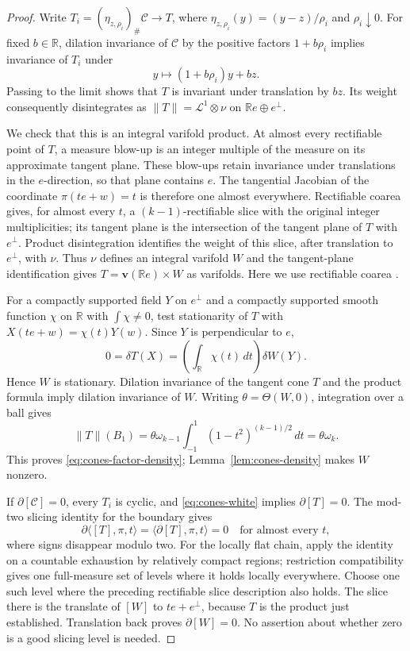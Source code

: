\begin{proof}
Write $T_i=(\eta_{z,\rho_i})_\#\mathcal C\to T$, where
$\eta_{z,\rho_i}(y)=(y-z)/\rho_i$ and $\rho_i\downarrow0$.
For fixed $b\in\mathbb R$, dilation invariance of $\mathcal C$
by the positive factors $1+b\rho_i$ implies invariance of $T_i$
under
\[
 y\longmapsto(1+b\rho_i)y+bz.
\]
Passing to the limit shows that $T$ is invariant under translation
by $bz$.  Its weight consequently disintegrates as
$\|T\|=\mathcal L^1\otimes\nu$ on
$\mathbb Re\oplus e^\perp$.

We check that this is an integral varifold product.
At almost every rectifiable point of $T$, a measure blow-up is an
integer multiple of the measure on its approximate tangent plane.
These blow-ups retain invariance under translations in the
$e$-direction, so that plane contains $e$.
The tangential Jacobian of the coordinate
$\pi(te+w)=t$ is therefore one almost everywhere.
Rectifiable coarea gives, for almost every $t$, a
$(k-1)$-rectifiable slice with the original integer multiplicities;
its tangent plane is the intersection of the tangent plane of $T$
with $e^\perp$.  Product disintegration identifies the weight of
this slice, after translation to $e^\perp$, with $\nu$.
Thus $\nu$ defines an integral varifold $W$ and the tangent-plane
identification gives $T=\mathbf v(\mathbb Re)\times W$ as varifolds.
Here we use rectifiable coarea
\cite[\S3, p.~300]{Federer1978}.

For a compactly supported field $Y$ on $e^\perp$ and a compactly
supported smooth function $\chi$ on $\mathbb R$ with
$\int\chi\ne0$, test stationarity of $T$ with
$X(te+w)=\chi(t)Y(w)$.  Since $Y$ is perpendicular to $e$,
\[
 0=\delta T(X)=\left(\int_{\mathbb R}\chi(t)\,dt\right)\delta W(Y).
\]
Hence $W$ is stationary.  Dilation invariance of the tangent cone
$T$ and the product formula imply dilation invariance of $W$.
Writing $\theta=\Theta(W,0)$, integration over a ball gives
\[
 \|T\|(B_1)
 =\theta\omega_{k-1}
       \int_{-1}^1(1-t^2)^{(k-1)/2}\,dt
 =\theta\omega_k.
\]
This proves \eqref{eq:cones-factor-density};
Lemma~\ref{lem:cones-density} makes $W$ nonzero.

If $\partial[\mathcal C]=0$, every $T_i$ is cyclic, and
\eqref{eq:cones-white} implies $\partial[T]=0$.
The mod-two slicing identity for the boundary
\cite[\S3, equation~(1) and Proposition~3.1]{White1999} gives
\[
 \partial\langle[T],\pi,t\rangle
       =\langle\partial[T],\pi,t\rangle=0
 \quad\text{for almost every }t,
\]
where signs disappear modulo two. For the locally flat chain, apply
the identity on a countable exhaustion by relatively compact regions;
restriction compatibility gives one full-measure set of levels where
it holds locally everywhere. Choose one such level where the preceding
rectifiable slice description also holds. The slice there is the
translate of $[W]$ to $te+e^\perp$,
because $T$ is the product just established.  Translation back
proves $\partial[W]=0$.  No assertion about whether zero is a good
slicing level is needed.
\end{proof}

